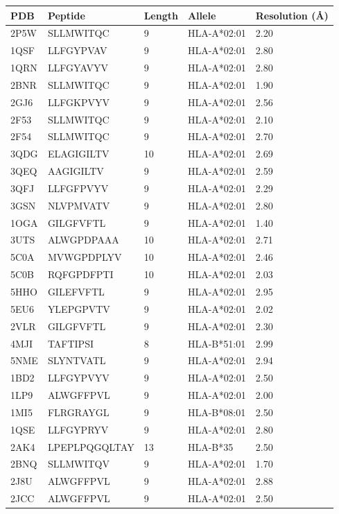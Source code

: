 \documentclass{article}
\begin{document}
\begin{table}[p]
\renewcommand{\thetable}{S1}
\centering
\small
\begin{tabular}{lllll}
\toprule
PDB & Peptide & Length & Allele & Resolution (\AA) \\
\midrule
2P5W & SLLMWITQC & 9 & HLA-A*02:01 & 2.20 \\
1QSF & LLFGYPVAV & 9 & HLA-A*02:01 & 2.80 \\
1QRN & LLFGYAVYV & 9 & HLA-A*02:01 & 2.80 \\
2BNR & SLLMWITQC & 9 & HLA-A*02:01 & 1.90 \\
2GJ6 & LLFGKPVYV & 9 & HLA-A*02:01 & 2.56 \\
2F53 & SLLMWITQC & 9 & HLA-A*02:01 & 2.10 \\
2F54 & SLLMWITQC & 9 & HLA-A*02:01 & 2.70 \\
3QDG & ELAGIGILTV & 10 & HLA-A*02:01 & 2.69 \\
3QEQ & AAGIGILTV & 9 & HLA-A*02:01 & 2.59 \\
3QFJ & LLFGFPVYV & 9 & HLA-A*02:01 & 2.29 \\
3GSN & NLVPMVATV & 9 & HLA-A*02:01 & 2.80 \\
1OGA & GILGFVFTL & 9 & HLA-A*02:01 & 1.40 \\
3UTS & ALWGPDPAAA & 10 & HLA-A*02:01 & 2.71 \\
5C0A & MVWGPDPLYV & 10 & HLA-A*02:01 & 2.46 \\
5C0B & RQFGPDFPTI & 10 & HLA-A*02:01 & 2.03 \\
5HHO & GILEFVFTL & 9 & HLA-A*02:01 & 2.95 \\
5EU6 & YLEPGPVTV & 9 & HLA-A*02:01 & 2.02 \\
2VLR & GILGFVFTL & 9 & HLA-A*02:01 & 2.30 \\
4MJI & TAFTIPSI & 8 & HLA-B*51:01 & 2.99 \\
5NME & SLYNTVATL & 9 & HLA-A*02:01 & 2.94 \\
\midrule
1BD2 & LLFGYPVYV & 9 & HLA-A*02:01 & 2.50 \\
1LP9 & ALWGFFPVL & 9 & HLA-A*02:01 & 2.00 \\
1MI5 & FLRGRAYGL & 9 & HLA-B*08:01 & 2.50 \\
1QSE & LLFGYPRYV & 9 & HLA-A*02:01 & 2.80 \\
2AK4 & LPEPLPQGQLTAY & 13 & HLA-B*35 & 2.50 \\
2BNQ & SLLMWITQV & 9 & HLA-A*02:01 & 1.70 \\
2J8U & ALWGFFPVL & 9 & HLA-A*02:01 & 2.88 \\
2JCC & ALWGFFPVL & 9 & HLA-A*02:01 & 2.50 \\

\end{tabular}
\end{table}
\end{document}
